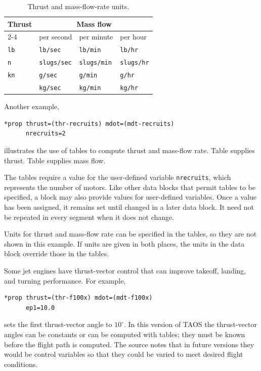 \begin{table}[htbp]
  \centering
  \caption{Thrust and mass-flow-rate units.}
  \label{tab:propulsion-units}
  \begin{tabular}{@{}llll@{}}
    \toprule
    Thrust & \multicolumn{3}{c}{Mass flow} \\
    \cmidrule(l){2-4}
    & per second & per minute & per hour \\
    \midrule
    \texttt{lb} & \texttt{lb/sec} & \texttt{lb/min} & \texttt{lb/hr} \\
    \texttt{n}  & \texttt{slugs/sec} & \texttt{slugs/min} & \texttt{slugs/hr} \\
    \texttt{kn} & \texttt{g/sec} & \texttt{g/min} & \texttt{g/hr} \\
                 & \texttt{kg/sec} & \texttt{kg/min} & \texttt{kg/hr} \\
    \bottomrule
  \end{tabular}
\end{table}

Another example,

\begin{lstlisting}[style=taosmanual]
*prop thrust=(thr-recruits) mdot=(mdt-recruits)
      nrecruits=2
\end{lstlisting}

illustrates the use of tables to compute thrust and mass-flow rate. Table
 supplies thrust. Table  supplies mass
flow.

The tables require a value for the user-defined variable \texttt{nrecruits}, which
represents the number of motors. Like other data blocks that permit tables to be
specified, a  block may also provide values for user-defined
variables. Once a value has been assigned, it remains set until changed in a later data
block. It need not be repeated in every segment when it does not change.

Units for thrust and mass-flow rate can be specified in the tables, so they are not
shown in this example. If units are given in both places, the units in the
 data block override those in the tables.

Some jet engines have thrust-vector control that can improve takeoff, landing, and
turning performance. For example,

\begin{lstlisting}[style=taosmanual]
*prop thrust=(thr-f100x) mdot=(mdt-f100x)
      ep1=10.0
\end{lstlisting}

sets the first thrust-vector angle to $10^\circ$. In this version of TAOS the thrust-vector
angles can be constants or can be computed with tables; they must be known before
the flight path is computed. The source notes that in future versions they would be
control variables so that they could be varied to meet desired flight conditions.
